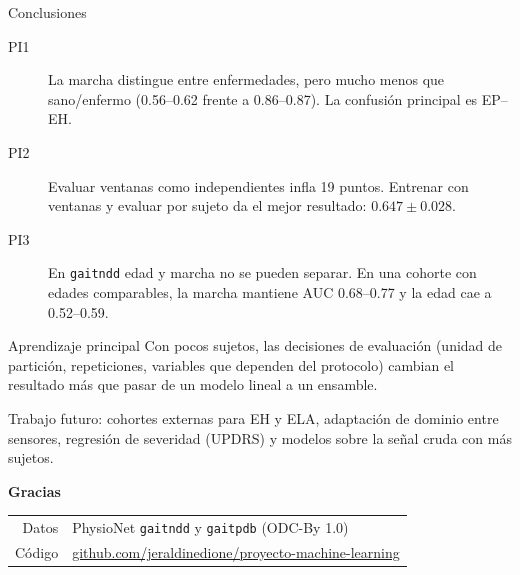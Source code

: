 \documentclass[aspectratio=169,10pt]{beamer}
\begin{document}
\begin{frame}{Conclusiones}
  \begin{description}
    \item[PI1] La marcha distingue entre enfermedades, pero mucho menos que sano/enfermo (0.56--0.62 frente a 0.86--0.87). La confusión principal es EP--EH.
      \vspace{0.4em}
    \item[PI2] Evaluar ventanas como independientes infla 19 puntos. Entrenar con ventanas y evaluar por sujeto da el mejor resultado: $0.647 \pm 0.028$.
      \vspace{0.4em}
    \item[PI3] En \texttt{gaitndd} edad y marcha no se pueden separar. En una cohorte con edades comparables, la marcha mantiene AUC 0.68--0.77 y la edad cae a 0.52--0.59.
  \end{description}

  \vspace{0.8em}
  \begin{block}{Aprendizaje principal}
    Con pocos sujetos, las decisiones de evaluación (unidad de partición, repeticiones, variables que dependen del protocolo) cambian el resultado más que pasar de un modelo lineal a un ensamble.
  \end{block}

  \vspace{0.4em}
  \small
  Trabajo futuro: cohortes externas para EH y ELA, adaptación de dominio entre sensores, regresión de severidad (UPDRS) y modelos sobre la señal cruda con más sujetos.
\end{frame}

\begin{frame}[plain]
  \vfill
  \centering
  {\Large\bfseries\color{structure} Gracias}

  \vspace{1.5em}
  \begin{tabular}{rl}
    Datos & PhysioNet \texttt{gaitndd} y \texttt{gaitpdb} (ODC-By 1.0) \\
    Código & \url{github.com/jeraldinedione/proyecto-machine-learning} \\
  \end{tabular}
  \vfill
\end{frame}
\end{document}
